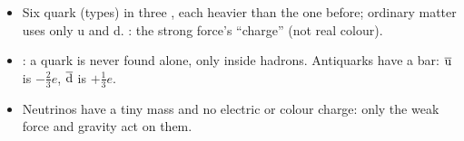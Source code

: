 \begin{keywords}
\end{keywords}

\begin{itemize}
  \item Six quark  (types) in three , each heavier than the
        one before; ordinary matter uses only u and d. : the strong force's
        ``charge'' (not real colour).
  \item {}: a quark is never found alone, only inside hadrons. Antiquarks
        have a bar: $\overline{\mathrm{u}}$ is $-\tfrac23 e$, $\overline{\mathrm{d}}$ is $+\tfrac13 e$.
  \item Neutrinos have a tiny mass and no electric or colour charge: only the weak force and
        gravity act on them.
\end{itemize}

